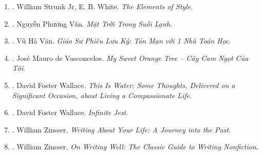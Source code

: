 \documentclass{article}
\begin{document}
\begin{enumerate}
	\item \cite{Strunk_White2019}. William Strunk Jr, E. B. White. \textit{The Elements of Style}.\hfill{\sf[done]}
	\item \cite{Van2022}. Nguyễn Phương Văn. \textit{Mặt Trời Trong Suối Lạnh}.\hfill{\sf[done]}
	\item \cite{VanVu2022}. Vũ Hà Văn. \textit{Giáo Sư Phiêu Lưu Ký: Tản Mạn với 1 Nhà Toán Học}.\hfill{\sf[done]}
	\item \cite{Vasconcelos_orange_tree}. Jos\'e Mauro de Vasconcelos. \textit{My Sweet Orange Tree -- Cây Cam Ngọt Của Tôi}.\hfill{\sf[done]}
	\item \cite{Wallace2009}. David Foster Wallace. \textit{This Is Water: Some Thoughts, Delivered on a Significant Occasion, about Living a Compassionate Life}.\hfill{\sf[done]}
	\item \cite{Wallace2011}. David Foster Wallace. \textit{Infinite Jest}.\hfill{\sf[reading]}
	\item \cite{Zinsser2005}. William Zinsser. \textit{Writing About Your Life: A Journey into the Past}.
	\item \cite{Zinsser2016}. William Zinsser. \textit{On Writing Well: The Classic Guide to Writing Nonfiction}.\hfill{\sf[reading]}
\end{enumerate}

\end{document}
